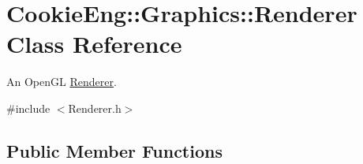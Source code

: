 \hypertarget{class_cookie_eng_1_1_graphics_1_1_renderer}{}\section{Cookie\+Eng\+:\+:Graphics\+:\+:Renderer Class Reference}
\label{class_cookie_eng_1_1_graphics_1_1_renderer}


An Open\+GL \hyperlink{class_cookie_eng_1_1_graphics_1_1_renderer}{Renderer}.  




{\ttfamily \#include $<$Renderer.\+h$>$}

\subsection*{Public Member Functions}
